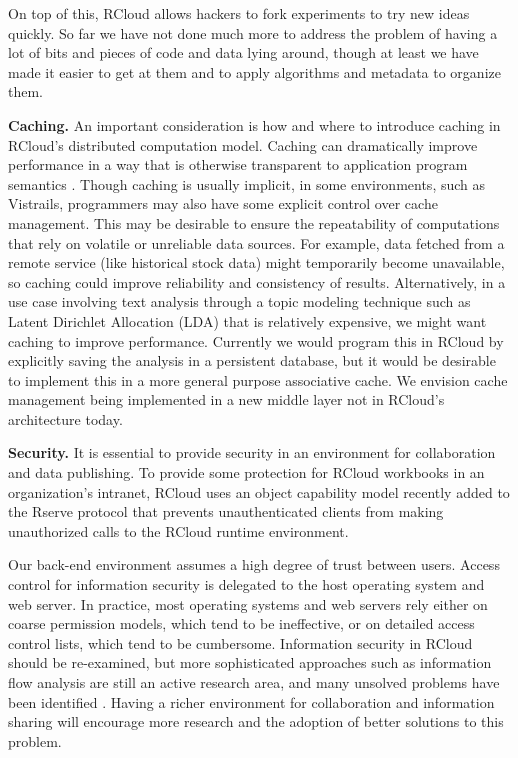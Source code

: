 On top of this, RCloud allows hackers to fork experiments to try
new ideas quickly. So far we have not done much more to address the
problem of having a lot of bits and pieces of code and data lying
around, though at least we have made it easier to get at them and
to apply algorithms and metadata to organize them.


{\bf Caching.}
An important consideration is how and where to introduce caching
in RCloud's distributed computation model. Caching can dramatically
improve performance in a way that is otherwise transparent to
application program semantics \cite{Callahan:2006:VVM, Guo:2010:TPI}.
Though caching is usually implicit, in some environments, such as
Vistrails, programmers may also have some explicit control over cache
management. This may be desirable to ensure the repeatability of
computations that rely on volatile or unreliable data sources.
For example, data fetched from a remote service (like historical stock data)
might temporarily become unavailable, so caching could improve
reliability and consistency of results. Alternatively, in a use case
involving text analysis through a topic modeling technique such as
Latent Dirichlet Allocation (LDA) that is relatively expensive,
we might want caching to improve performance. Currently we would
program this in RCloud by explicitly saving the analysis in a
persistent database, but it would be desirable to implement this
in a more general purpose associative cache. We envision cache
management being implemented in a new middle layer not in RCloud's
architecture today.

{\bf Security.}
It is essential to provide security in an environment for
collaboration and data publishing. To provide some
protection for RCloud workbooks in an organization's intranet,
RCloud uses an object capability model \cite{Miller:2006:RCT}
recently added to the Rserve protocol \cite{Urbanek:2003:AFW}
that prevents unauthenticated clients from making
unauthorized calls to the RCloud runtime environment.

Our back-end environment assumes a high degree of trust between users.
Access control for information security is delegated to the host
operating system and web server. In practice, most operating
systems and web servers rely either on coarse permission models,
which tend to be ineffective, or on detailed access control
lists, which tend to be cumbersome. 
Information security in RCloud should be re-examined, but more
sophisticated approaches such as information flow analysis are
still an active research area, and many unsolved problems have
been identified \cite{Moore:2011:SAF}. Having a richer environment for
collaboration and information sharing will encourage more research
and the adoption of better solutions to this problem.
